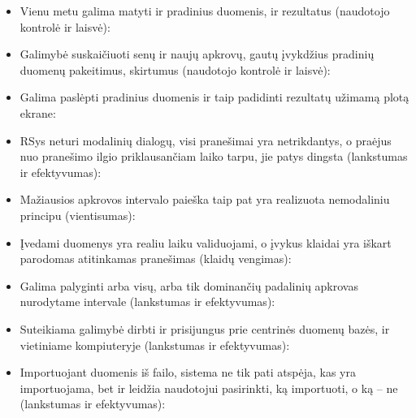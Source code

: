 \begin{itemize}
  \item Vienu metu galima matyti ir pradinius duomenis, ir rezultatus
  (naudotojo kontrolė ir laisvė):

  \item Galimybė suskaičiuoti senų ir naujų apkrovų, gautų įvykdžius pradinių
  duomenų pakeitimus, skirtumus (naudotojo kontrolė ir laisvė):

  \item Galima paslėpti pradinius duomenis ir taip padidinti rezultatų užimamą
  plotą ekrane:

  \item RSys neturi modalinių dialogų, visi pranešimai yra netrikdantys, o praėjus
    nuo pranešimo ilgio priklausančiam laiko tarpu, jie patys dingsta
    (lankstumas ir efektyvumas):

  \item Mažiausios apkrovos intervalo paieška taip pat yra realizuota nemodaliniu principu
  (vientisumas):

  \item Įvedami duomenys yra realiu laiku validuojami, o įvykus klaidai yra iškart parodomas
  atitinkamas pranešimas (klaidų vengimas):

  \item Galima palyginti arba visų, arba tik dominančių padalinių apkrovas nurodytame intervale
  (lankstumas ir efektyvumas):

  \item Suteikiama galimybė dirbti ir prisijungus prie centrinės duomenų bazės, ir vietiniame
  kompiuteryje (lankstumas ir efektyvumas):

  \item
    Importuojant duomenis iš failo, sistema ne tik pati atspėja, kas
    yra importuojama, bet ir leidžia naudotojui pasirinkti, ką
    importuoti, o ką – ne (lankstumas ir efektyvumas):


\end{itemize}
